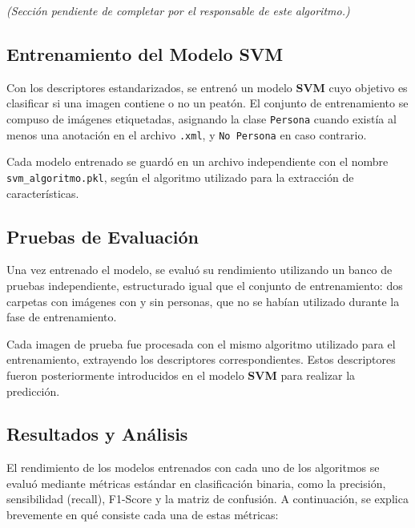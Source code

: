 \documentclass[a4paper]{article}
\begin{document}
\textit{(Sección pendiente de completar por el responsable de este algoritmo.)}



\subsection{Entrenamiento del Modelo SVM}

Con los descriptores estandarizados, se entrenó un modelo \textbf{SVM} cuyo objetivo es clasificar si una imagen contiene o no un peatón. El conjunto de entrenamiento se compuso de imágenes etiquetadas, asignando la clase \texttt{Persona} cuando existía al menos una anotación en el archivo \texttt{.xml}, y \texttt{No Persona} en caso contrario.

\par\vspace{0.5cm}

Cada modelo entrenado se guardó en un archivo independiente con el nombre \texttt{svm\_algoritmo.pkl}, según el algoritmo utilizado para la extracción de características.

\subsection{Pruebas de Evaluación}

Una vez entrenado el modelo, se evaluó su rendimiento utilizando un banco de pruebas independiente, estructurado igual que el conjunto de entrenamiento: dos carpetas con imágenes con y sin personas, que no se habían utilizado durante la fase de entrenamiento.
\par\vspace{0.5cm}

Cada imagen de prueba fue procesada con el mismo algoritmo utilizado para el entrenamiento, extrayendo los descriptores correspondientes. Estos descriptores fueron posteriormente introducidos en el modelo \textbf{SVM} para realizar la predicción.

\subsection{Resultados y Análisis}

El rendimiento de los modelos entrenados con cada uno de los algoritmos se evaluó mediante métricas estándar en clasificación binaria, como la precisión, sensibilidad (recall), F1-Score y la matriz de confusión. A continuación, se explica brevemente en qué consiste cada una de estas métricas:
\end{document}
